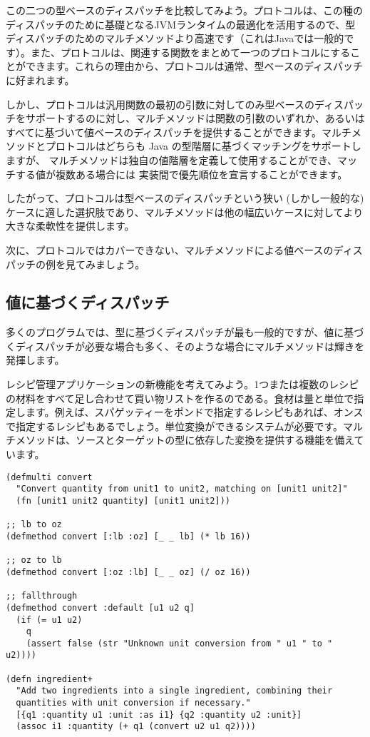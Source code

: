 この二つの型ベースのディスパッチを比較してみよう。プロトコルは、この種のディスパッチのために基礎となるJVMランタイムの最適化を活用するので、型ディスパッチのためのマルチメソッドより高速です（これはJavaでは一般的です）。また、プロトコルは、関連する関数をまとめて一つのプロトコルにすることができます。これらの理由から、プロトコルは通常、型ベースのディスパッチに好まれます。

しかし、プロトコルは汎用関数の最初の引数に対してのみ型ベースのディスパッチをサポートするのに対し、マルチメソッドは関数の引数のいずれか、あるいはすべてに基づいて値ベースのディスパッチを提供することができます。マルチメソッドとプロトコルはどちらも Java の型階層に基づくマッチングをサポートしますが、 マルチメソッドは独自の値階層を定義して使用することができ、マッチする値が複数ある場合には 実装間で優先順位を宣言することができます。

したがって、プロトコルは型ベースのディスパッチという狭い (しかし一般的な) ケースに適した選択肢であり、マルチメソッドは他の幅広いケースに対してより大きな柔軟性を提供します。

次に、プロトコルではカバーできない、マルチメソッドによる値ベースのディスパッチの例を見てみましょう。

\subsection{値に基づくディスパッチ}

多くのプログラムでは、型に基づくディスパッチが最も一般的ですが、値に基づくディスパッチが必要な場合も多く、そのような場合にマルチメソッドは輝きを発揮します。

レシピ管理アプリケーションの新機能を考えてみよう。1つまたは複数のレシピの材料をすべて足し合わせて買い物リストを作るのである。食材は量と単位で指定します。例えば、スパゲッティーをポンドで指定するレシピもあれば、オンスで指定するレシピもあるでしょう。単位変換ができるシステムが必要です。マルチメソッドは、ソースとターゲットの型に依存した変換を提供する機能を備えています。

\begin{lstlisting}[numbers=none]
(defmulti convert
  "Convert quantity from unit1 to unit2, matching on [unit1 unit2]"
  (fn [unit1 unit2 quantity] [unit1 unit2]))

;; lb to oz
(defmethod convert [:lb :oz] [_ _ lb] (* lb 16))

;; oz to lb
(defmethod convert [:oz :lb] [_ _ oz] (/ oz 16))

;; fallthrough
(defmethod convert :default [u1 u2 q]
  (if (= u1 u2)
    q
    (assert false (str "Unknown unit conversion from " u1 " to " u2))))

(defn ingredient+
  "Add two ingredients into a single ingredient, combining their
  quantities with unit conversion if necessary."
  [{q1 :quantity u1 :unit :as i1} {q2 :quantity u2 :unit}]
  (assoc i1 :quantity (+ q1 (convert u2 u1 q2))))
\end{lstlisting}

